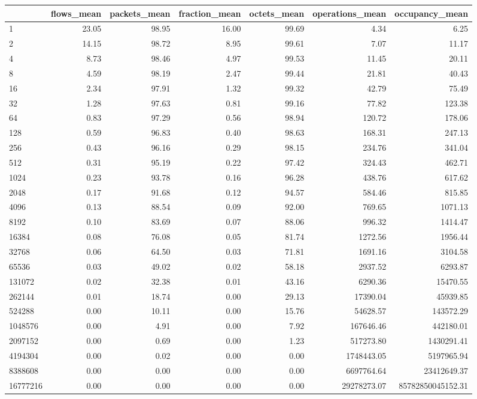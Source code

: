\begin{tabular}{lrrrrrr}
\toprule
 & flows_mean & packets_mean & fraction_mean & octets_mean & operations_mean & occupancy_mean \\
\midrule
1 & 23.05 & 98.95 & 16.00 & 99.69 & 4.34 & 6.25 \\
2 & 14.15 & 98.72 & 8.95 & 99.61 & 7.07 & 11.17 \\
4 & 8.73 & 98.46 & 4.97 & 99.53 & 11.45 & 20.11 \\
8 & 4.59 & 98.19 & 2.47 & 99.44 & 21.81 & 40.43 \\
16 & 2.34 & 97.91 & 1.32 & 99.32 & 42.79 & 75.49 \\
32 & 1.28 & 97.63 & 0.81 & 99.16 & 77.82 & 123.38 \\
64 & 0.83 & 97.29 & 0.56 & 98.94 & 120.72 & 178.06 \\
128 & 0.59 & 96.83 & 0.40 & 98.63 & 168.31 & 247.13 \\
256 & 0.43 & 96.16 & 0.29 & 98.15 & 234.76 & 341.04 \\
512 & 0.31 & 95.19 & 0.22 & 97.42 & 324.43 & 462.71 \\
1024 & 0.23 & 93.78 & 0.16 & 96.28 & 438.76 & 617.62 \\
2048 & 0.17 & 91.68 & 0.12 & 94.57 & 584.46 & 815.85 \\
4096 & 0.13 & 88.54 & 0.09 & 92.00 & 769.65 & 1071.13 \\
8192 & 0.10 & 83.69 & 0.07 & 88.06 & 996.32 & 1414.47 \\
16384 & 0.08 & 76.08 & 0.05 & 81.74 & 1272.56 & 1956.44 \\
32768 & 0.06 & 64.50 & 0.03 & 71.81 & 1691.16 & 3104.58 \\
65536 & 0.03 & 49.02 & 0.02 & 58.18 & 2937.52 & 6293.87 \\
131072 & 0.02 & 32.38 & 0.01 & 43.16 & 6290.36 & 15470.55 \\
262144 & 0.01 & 18.74 & 0.00 & 29.13 & 17390.04 & 45939.85 \\
524288 & 0.00 & 10.11 & 0.00 & 15.76 & 54628.57 & 143572.29 \\
1048576 & 0.00 & 4.91 & 0.00 & 7.92 & 167646.46 & 442180.01 \\
2097152 & 0.00 & 0.69 & 0.00 & 1.23 & 517273.80 & 1430291.41 \\
4194304 & 0.00 & 0.02 & 0.00 & 0.00 & 1748443.05 & 5197965.94 \\
8388608 & 0.00 & 0.00 & 0.00 & 0.00 & 6697764.64 & 23412649.37 \\
16777216 & 0.00 & 0.00 & 0.00 & 0.00 & 29278273.07 & 85782850045152.31 \\
\bottomrule
\end{tabular}

